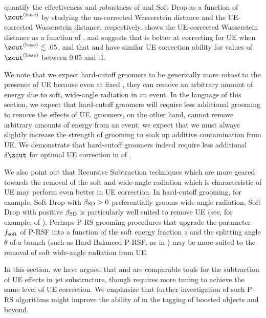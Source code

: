  quantify the effectiveness and robustness of  and Soft Drop as a function of \(\zcut^{(\rm base)}\) by studying the un-corrected Wasserstein distance and the UE-corrected Wasserstein distance, respectively.
%
 shows the UE-corrected Wasserstein distance as a function of \zcut, and suggests that  is better at correcting for UE when \(\zcut^{(\rm base)} \lesssim .05\), and that  and  have similar UE correction ability for values of \(\zcut^{(\rm base)}\) between 0.05 and .1.

We note that we expect hard-cutoff groomers to be generically more \textit{robust} to the presence of UE because even at fixed \zcut, they can remove an arbitrary amount of energy due to soft, wide-angle radiation in an event.
%
In the language of this section, we expect that hard-cutoff groomers will require less additional grooming to remove the effects of UE.
%
\PIRANHA{} groomers, on the other hand, cannot remove arbitrary amounts of energy from an event;
%
we expect that we must always slightly increase the strength of \PIRANHA{} grooming to soak up additive contamination from UE.
%
We demonstrate that hard-cutoff groomers indeed require less additional \(\delta\zcut\) for optimal UE correction in  of .

    We also point out that Recursive Subtraction techniques which are more geared towards the removal of the soft and wide-angle radiation which is characteristic of UE may perform even better in UE correction.
    In hard-cutoff grooming, for example, Soft Drop with \(\beta_{\rm SD} > 0\) preferentially grooms wide-angle radiation, Soft Drop with positive \(\beta_{\rm SD}\) is particularly well suited to remove UE (see, for example,  of ).
   Perhaps P-RS grooming procedures that upgrade the parameter \(f_{\rm soft}\) of P-RSF into a function of the soft energy fraction \(z\) and the splitting angle \(\theta\) of a branch  (such as Hard-Balanced P-RSF, as in ) may be more suited to the removal of soft wide-angle radiation from UE.

   In this section, we have argued that  and  are comparable tools for the subtraction of UE effects in jet substructure, though  requires more tuning to achieve the same level of UE correction.
   We emphasize that further investigation of such P-RS algorithms might improve the ability of \PIRANHA{} in the tagging of boosted objects and beyond.


